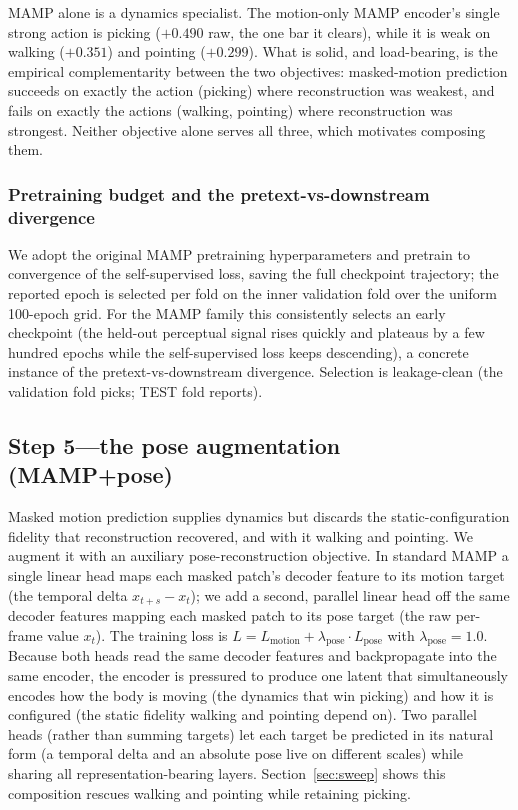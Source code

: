 \documentclass[letterpaper]{article} %
\begin{document}
{MAMP alone is a dynamics specialist.} The motion-only MAMP encoder's single strong action
is picking ($+0.490$ raw, the one bar it clears), while it is weak on walking ($+0.351$) and
pointing ($+0.299$). What is solid, and load-bearing, is the {empirical complementarity}
between the two objectives: masked-motion prediction succeeds on exactly the action (picking)
where reconstruction was weakest, and fails on exactly the actions (walking, pointing) where
reconstruction was strongest. Neither objective alone serves all three, which motivates
{composing} them.

\subsubsection{Pretraining budget and the pretext-vs-downstream divergence}
\label{sec:budget}
We adopt the original MAMP pretraining hyperparameters and pretrain to convergence of the
self-supervised loss, saving the full checkpoint trajectory; the reported epoch is selected per
fold on the inner validation fold over the uniform 100-epoch grid. For the MAMP family this
consistently selects an {early} checkpoint (the held-out perceptual signal rises quickly
and plateaus by a few hundred epochs while the self-supervised loss keeps descending), a concrete
instance of the pretext-vs-downstream divergence. Selection is leakage-clean (the validation fold picks;
TEST fold reports).

\subsection{Step 5---the pose augmentation (MAMP+pose)}
Masked motion prediction supplies dynamics but discards the static-configuration fidelity that
reconstruction recovered, and with it walking and pointing. We augment it with an
{auxiliary pose-reconstruction objective}. In standard MAMP a single linear head maps each
masked patch's decoder feature to its {motion} target (the temporal delta $x_{t+s}-x_t$);
we add a {second, parallel linear head} off the {same} decoder features mapping each
masked patch to its {pose} target (the raw per-frame value $x_t$). The training loss is
$L = L_{\text{motion}} + \lambda_{\text{pose}} \cdot L_{\text{pose}}$ with
$\lambda_{\text{pose}}=1.0$. Because both heads read the same decoder features and backpropagate
into the same encoder, the encoder is pressured to produce one latent that simultaneously encodes
how the body is {moving} (the dynamics that win picking) and how it is {configured} (the
static fidelity walking and pointing depend on). Two parallel heads (rather than summing targets)
let each target be predicted in its natural form (a temporal delta and an absolute pose live on
different scales) while sharing all representation-bearing layers. Section~\ref{sec:sweep} shows this
composition rescues walking and pointing while retaining picking.
\end{document}
